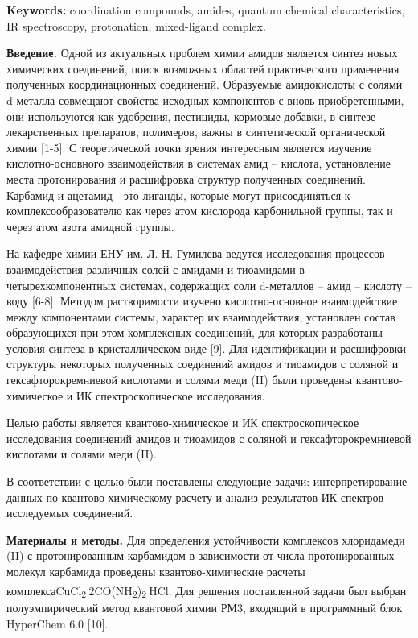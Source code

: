 {\bfseries Keywords:} coordination compounds, amides, quantum chemical
characteristics, IR spectroscopy, protonation, mixed-ligand complex.

\begin{multicols}{2}
{\bfseries Введение.} Одной из актуальных проблем химии амидов является
синтез новых химических соединений, поиск возможных областей
практического применения полученных координационных соединений.
Образуемые амидокислоты с солями d-металла совмещают свойства исходных
компонентов с вновь приобретенными, они используются как удобрения,
пестициды, кормовые добавки, в синтезе лекарственных препаратов,
полимеров, важны в синтетической органической химии {[}1-5{]}. С
теоретической точки зрения интересным является изучение
кислотно-основного взаимодействия в системах амид -- кислота,
установление места протонирования и расшифровка структур полученных
соединений. Карбамид и ацетамид - это лиганды, которые могут
присоединяться к комплексообразователю как через атом кислорода
карбонильной группы, так и через атом азота амидной группы.

На кафедре химии ЕНУ им. Л. Н. Гумилева ведутся исследования процессов
взаимодействия различных солей с амидами и тиоамидами в
четырехкомпонентных системах, содержащих соли d-металлов -- амид --
кислоту -- воду {[}6-8{]}. Методом растворимости изучено
кислотно-основное взаимодействие между компонентами системы, характер их
взаимодействия, установлен состав образующихся при этом комплексных
соединений, для которых разработаны условия синтеза в кристаллическом
виде {[}9{]}. Для идентификации и расшифровки структуры некоторых
полученных соединений амидов и тиоамидов с соляной и
гексафторокремниевой кислотами и солями меди (II) были проведены
квантово-химическое и ИК спектроскопическое исследования.

Целью работы является квантово-химическое и ИК спектроскопическое
исследования соединений амидов и тиоамидов с соляной и
гексафторокремниевой кислотами и солями меди (II).

В соответствии с целью были поставлены следующие задачи:
интерпретирование данных по квантово-химическому расчету и анализ
результатов ИК-спектров исследуемых соединений.

{\bfseries Материалы и методы.} Для определения устойчивости комплексов
хлоридамеди (II) с протонированным карбамидом в зависимости от числа
протонированных молекул карбамида проведены квантово-химические расчеты
комплексаCuCl\textsubscript{2}\textsuperscript{.}2CO(NH\textsubscript{2})\textsubscript{2}\textsuperscript{.}HCl.
Для решения поставленной задачи был выбран полуэмпирический метод
квантовой химии РМ3, входящий в программный блок HyperChem 6.0 {[}10{]}.


\end{multicols}
